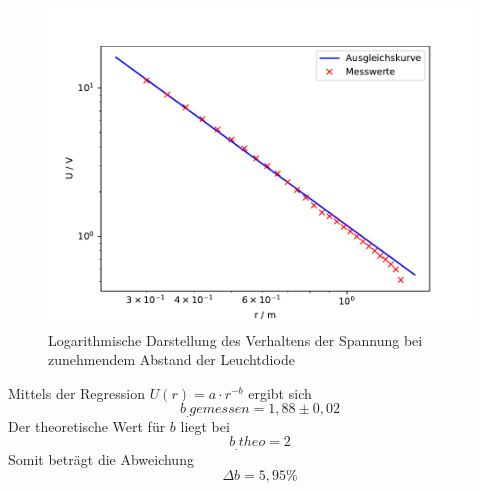 \begin{figure}
\centering
\includegraphics[scale=0.5]{content/images/plot3.pdf}
\caption{Logarithmische Darstellung des Verhaltens der Spannung bei zunehmendem Abstand der Leuchtdiode}\label{fig:U5}
\end{figure}
Mittels der Regression $U(r)=a\cdot r^{-b}$ ergibt sich
\[
b_.{gemessen}=1,88\pm 0,02
\]
Der theoretische Wert für $b$ liegt bei 
\[
b_.{theo}=2
\]
Somit beträgt die Abweichung
\[
\Delta b = 5,95 \%
\]